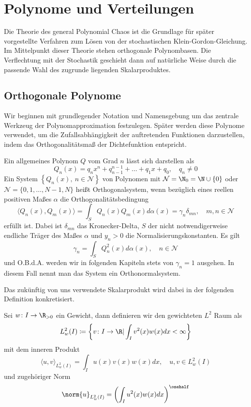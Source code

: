 \section{Polynome und Verteilungen}
Die Theorie des general Polynomial Chaos ist die Grundlage für später vorgestellte Verfahren zum Lösen von der stochastischen Klein-Gordon-Gleichung. Im Mittelpunkt dieser Theorie stehen orthogonale Polynombasen. Die Verflechtung mit der Stochastik geschieht dann auf natürliche Weise durch die passende Wahl des zugrunde liegenden Skalarproduktes.
\subsection{Orthogonale Polynome}
Wir beginnen mit grundlegender Notation und Namensgebung um das zentrale Werkzeug der Polynomapproximation festzulegen. Später werden diese Polynome verwendet, um die Zufallsabhängigkeit der auftretenden Funktionen darzustellen, indem das Orthogonalitätsmaß der Dichtefunktion entspricht.
\begin{mathdef}
Ein allgemeines Polynom $Q$ vom Grad $n$ lässt sich darstellen als
\[Q_n(x)=q_nx^n+q_{n-1}^{n-1}+\dots+q_1x+q_0,\quad q_n\ne 0\]
Ein System $\left\lbrace Q_n(x),\: n\in\mathcal{N}\right\rbrace$ von Polynomen mit $\mathcal{N}=\N_0=\N\cup\lbrace 0\rbrace$ oder $\mathcal{N}=\lbrace 0,1,\dots,N-1,N\rbrace$ heißt Orthogonalsystem, wenn bezüglich eines reellen positiven Maßes $\alpha$ die Orthogonalitätsbedingung
 \[\langle Q_n(x),Q_m(x)\rangle =\int_S Q_n(x)Q_m(x)d\alpha(x)=\gamma_n\delta_{mn},\quad m,n\in\mathcal{N}\]
 erfüllt ist. Dabei ist $\delta_{mn}$ das Kronecker-Delta, $S$ der nicht notwendigerweise endliche Träger des Maßes $\alpha$ und $y_n>0$ die Normalisierungskonstanten. Es gilt 
 \[\gamma_n=\int_S Q_n^2(x)d\alpha(x),\quad n\in\mathcal{N}\] und O.B.d.A. werden wir in folgenden Kapiteln stets von $\gamma_n=1$ ausgehen. In diesem Fall nennt man das System ein Orthonormalsystem.
\end{mathdef}
Das zukünftig von uns verwendete Skalarprodukt wird dabei in der folgenden Definition konkretisiert.
\begin{mathdef}
Sei $w\colon I\to\R_{>0}$ ein Gewicht, dann definieren wir den gewichteten $L^2$ Raum als
\begin{equation*}
L_w^2(I)\coloneqq \left\lbrace v\colon I\to\R | \int_Iv^2(x)w(x)dx<\infty\right\rbrace
\end{equation*}
mit dem inneren Produkt 
\[\langle u,v\rangle_{L_w^2(I)}=\int_I u(x)v(x)w(x)dx,\quad u,v\in L_w^2(I)\]
und zugehöriger Norm
\[\norm{u}_{L_w^2(I)}=\left(\int_I u^2(x)w(x)dx\right)^{\onehalf}\]
\end{mathdef}

